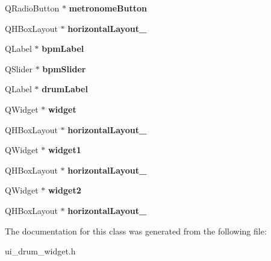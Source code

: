 \begin{DoxyCompactItemize}
Q\+Radio\+Button $\ast$ {\bfseries metronome\+Button}
\item 
\mbox{\label{classUi__drum__widget_a966e43cd8d7bb2fe0746882256e440e2}} 
Q\+H\+Box\+Layout $\ast$ {\bfseries horizontal\+Layout\+\_}
\item 
\mbox{\label{classUi__drum__widget_a5fcaa04731b68dfefad1559e2a0ac1f9}} 
Q\+Label $\ast$ {\bfseries bpm\+Label}
\item 
\mbox{\label{classUi__drum__widget_a53d0acc4fa4bffe08cce4aace73a1888}} 
Q\+Slider $\ast$ {\bfseries bpm\+Slider}
\item 
\mbox{\label{classUi__drum__widget_ac23710126d610dc1b2fa6cd9f6172dd0}} 
Q\+Label $\ast$ {\bfseries drum\+Label}
\item 
\mbox{\label{classUi__drum__widget_a69323e8c69ba52a91c991d4ae2712e10}} 
Q\+Widget $\ast$ {\bfseries widget}
\item 
\mbox{\label{classUi__drum__widget_a7ba93d2bb365caf3a51910708e8459f3}} 
Q\+H\+Box\+Layout $\ast$ {\bfseries horizontal\+Layout\+\_}
\item 
\mbox{\label{classUi__drum__widget_ac3f52fe8a3f56273ca421bc6d90e00a3}} 
Q\+Widget $\ast$ {\bfseries widget1}
\item 
\mbox{\label{classUi__drum__widget_abe8cab607dee2676c160c750005933e9}} 
Q\+H\+Box\+Layout $\ast$ {\bfseries horizontal\+Layout\+\_}
\item 
\mbox{\label{classUi__drum__widget_afa7a24253c6c0295a2ee95db731ea0ea}} 
Q\+Widget $\ast$ {\bfseries widget2}
\item 
\mbox{\label{classUi__drum__widget_aa158e7d1ecb9c605cf3e84e369efa822}} 
Q\+H\+Box\+Layout $\ast$ {\bfseries horizontal\+Layout\+\_}
\end{DoxyCompactItemize}


The documentation for this class was generated from the following file\+:\begin{DoxyCompactItemize}
\item 
ui\+\_\+drum\+\_\+widget.\+h\end{DoxyCompactItemize}

